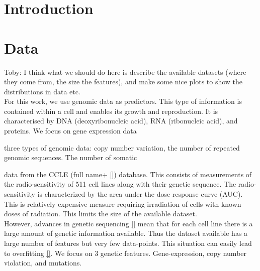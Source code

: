 \documentclass[NOTE, disdraft=true, UKenglish]{\DISCDTLATEXPATH UCLCDTDISdoc}
\begin{document}
\maketitle

\tableofcontents

\clearpage


\newpage

\newpage
\section{Introduction}
\label{sec:introduction}
%
\section{Data}
\label{sec:data}
{\color{red}Toby: I think what we should do here is describe the available datasets (where they come from, the size the features), and make some nice plots to show the distributions in data etc.}
\\
For this work, we use genomic data as predictors. This type of information is contained within a cell and enables its growth and reproduction. It is characterised by DNA (deoxyribonucleic acid), RNA (ribonucleic acid), and proteins. We focus on gene expression data

three types of genomic data: copy number variation, the number of repeated genomic sequences. The number of somatic 

data from the CCLE (full name+ \ref{}) database. This consists of measurements of the radio-sensitivity of 511 cell lines along with their genetic sequence. The radio-sensitivity is characterized by the area under the dose response curve (AUC). This is relatively expensive measure requiring irradiation of cells with known doses of radiation. This limits the size of the available dataset. 
\\ \indent However, advances in genetic sequencing \ref{} mean that for each cell line there is a large amount of genetic information available. Thus the dataset available has a large number of features but very few data-points. This situation can easily lead to overfitting \ref{}. We focus on 3 genetic features. Gene-expression, copy number violation, and mutations.
\end{document}

